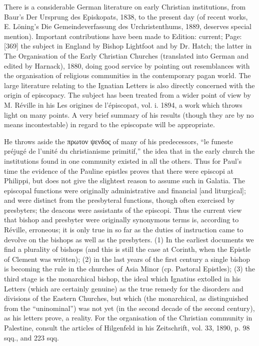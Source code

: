
There is a considerable German literature on early Christian institutions, from Baur\texthebrew{}’s Der Ursprung des Episkopats, 1838, to the present day (of recent works, E. Löning\texthebrew{}’s Die Gemeindeverfassung des Urchristenthums, 1889, deserves special mention). Important contributions have been made to Edition: current; Page: [369] the subject in England by Bishop Lightfoot and by Dr. Hatch; the latter in The Organisation of the Early Christian Churches (translated into German and edited by Harnack), 1880, doing good service by pointing out resemblances with the organisation of religious communities in the contemporary pagan world. The large literature relating to the Ignatian Letters is also directly concerned with the origin of episcopacy. The subject has been treated from a wider point of view by M. Réville in his Les origines de l\texthebrew{}’épiscopat, vol. i. 1894, a work which throws light on many points. A very brief summary of his results (though they are by no means incontestable) in regard to the episcopate will be appropriate.

He throws aside the \textgreek{πρωτον ψενδος} of many of his predecessors, \texthebrew{“}le funeste préjugé de l\texthebrew{}’unité du christianisme primitif,\texthebrew{}” the idea that in the early church the institutions found in one community existed in all the others. Thus for Paul\texthebrew{}’s time the evidence of the Pauline epistles proves that there were episcopi at Philippi, but does not give the slightest reason to assume such in Galatia. The episcopal functions were originally administrative and financial [and liturgical]; and were distinct from the presbyteral functions, though often exercised by presbyters; the deacons were assistants of the episcopi. Thus the current view that bishop and presbyter were originally synonymous terms is, according to Réville, erroneous; it is only true in so far as the duties of instruction came to devolve on the bishops as well as the presbyters. (1) In the earliest documents we find a plurality of bishops (and this is still the case at Corinth, when the Epistle of Clement was written); (2) in the last years of the first century a single bishop is becoming the rule in the churches of Asia Minor (cp. Pastoral Epistles); (3) the third stage is the monarchical bishop, the ideal which Ignatius extolled in his Letters (which are certainly genuine) as the true remedy for the disorders and divisions of the Eastern Churches, but which (the monarchical, as distinguished from the \texthebrew{“}uninominal\texthebrew{}”) was not yet (in the second decade of the second century), as his letters prove, a reality. For the organisation of the Christian community in Palestine, consult the articles of Hilgenfeld in his Zeitschrift, vol. 33, 1890, p. 98 sqq., and 223 sqq.

